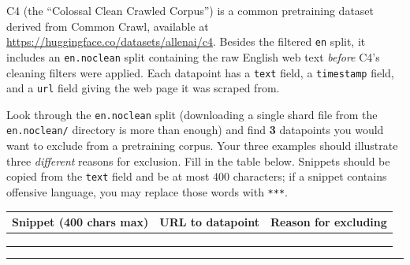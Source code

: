 \documentclass[11pt]{article}
\newcommand{\wrd}[1]{\texttt{#1}}
\begin{document}
C4 (the ``Colossal Clean Crawled Corpus'') is a common pretraining dataset derived from Common Crawl, available at
\url{https://huggingface.co/datasets/allenai/c4}. Besides the filtered \wrd{en} split, it includes an
\wrd{en.noclean} split containing the raw English web text \emph{before} C4's cleaning filters were applied. Each
datapoint has a \wrd{text} field, a \wrd{timestamp} field, and a \wrd{url} field giving the web page it was scraped
from.

\medskip\noindent
Look through the \wrd{en.noclean} split (downloading a single shard file from the \wrd{en.noclean/} directory is
more than enough) and find \textbf{3} datapoints you would want to exclude from a pretraining corpus. Your three
examples should illustrate three \emph{different} reasons for exclusion. Fill in the table below. Snippets should be
copied from the \wrd{text} field and be at most $400$ characters; if a snippet contains offensive language, you may
replace those words with \wrd{***}.

\begin{table}[H]
    \centering
    \small
    \begin{tabular}{p{6.6cm}|p{4.2cm}|p{4.2cm}}
    \toprule
    Snippet (400 chars max) & URL to datapoint & Reason for excluding \\
    \midrule
     & & \\[3em]
    \midrule
     & & \\[3em]
    \midrule
     & & \\[3em]
    \bottomrule
    \end{tabular}
\end{table}

\vspace{1em}
\hrule
\vspace{0.5em}
\noindent
\small
\end{document}
